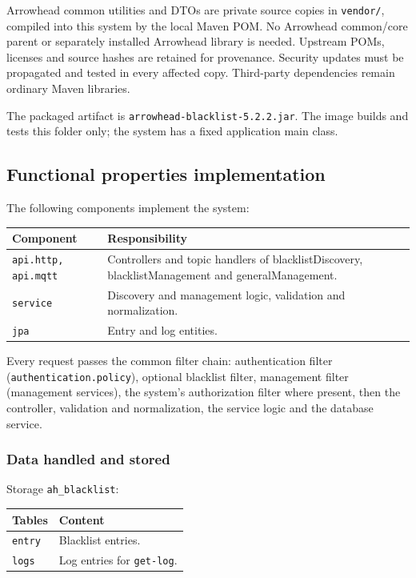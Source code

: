 \documentclass[a4paper]{arrowhead}
\begin{document}
Arrowhead common utilities and DTOs are private source copies in \texttt{vendor/}, compiled into this system by the local Maven POM. No Arrowhead common/core parent or separately installed Arrowhead library is needed. Upstream POMs, licenses and source hashes are retained for provenance. Security updates must be propagated and tested in every affected copy. Third-party dependencies remain ordinary Maven libraries.

The packaged artifact is \texttt{arrowhead-\allowbreak{}blacklist-5.2.2.jar}. The image builds and tests this folder only; the system has a fixed application main class.

\subsection{Functional properties implementation}

The following components implement the system:

\noindent\begin{longtable}{| p{5.6cm} | p{9.6cm} |} \hline
\rowcolor{gray!33} Component & Responsibility \\ \hline \endhead
\texttt{api.\allowbreak{}http,\allowbreak{} api.\allowbreak{}mqtt} & Controllers and topic handlers of blacklist\allowbreak{}Discovery, blacklist\allowbreak{}Management and generalManagement. \\ \hline
\texttt{service} & Discovery and management logic, validation and normalization. \\ \hline
\texttt{jpa} & Entry and log entities. \\ \hline
\end{longtable}

Every request passes the common filter chain: authentication filter (\texttt{authentication.\allowbreak{}policy}), optional blacklist filter, management filter (management services), the system's authorization filter where present, then the controller, validation and normalization, the service logic and the database service.

\subsubsection{Data handled and stored}

Storage \texttt{ah\_\allowbreak{}blacklist}:

\noindent\begin{longtable}{| p{6.4cm} | p{8.8cm} |} \hline
\rowcolor{gray!33} Tables & Content \\ \hline \endhead
\texttt{entry} & Blacklist entries. \\ \hline
\texttt{logs} & Log entries for \texttt{get-\allowbreak{}log}. \\ \hline
\end{longtable}
\end{document}
